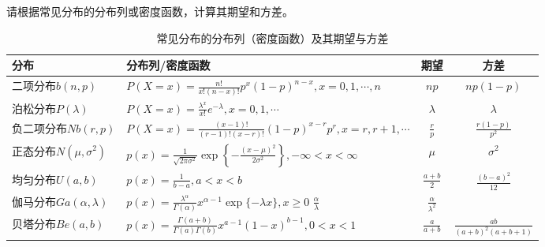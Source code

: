 \begin{enumerate}
\begin{exercise} 请根据常见分布的分布列或密度函数，计算其期望和方差。
	\begin{table}[ht]
			\centering
   \caption{常见分布的分布列（密度函数）及其期望与方差}
			\begin{tabular}{llc c}
				\hline
				分布 & 分布列/密度函数& 期望& 方差\\
				\hline
				二项分布$b(n,p)$ & $P(X=x) = \frac{n!}{x!(n-x)!} p^x (1-p)^{n-x}, x = 0,1, \cdots,n$ & $np$&$np(1-p)$\\
			\hline
				泊松分布$P(\lambda)$ &$P(X=x) = \frac{\lambda^x}{x!} e^{-\lambda }, x = 0,1, \cdots$  & $\lambda$& $\lambda$\\
					\hline
				负二项分布$Nb(r,p)$ &$P(X=x) = \frac{(x-1)!}{(r-1)!(x-r)!} (1-p)^{x-r}p^r, x = r,r+1, \cdots$ & $\frac{r}{p}$& $\frac{r(1-p)}{p^2}$\\
				\hline
				正态分布$N(\mu,\sigma^2)$ &$p(x) = \frac{1}{\sqrt{2\pi \sigma^2}} \exp\left\{-\frac{(x-\mu)^2}{2\sigma^2}\right\}, -\infty <x <\infty$ &$\mu$&$\sigma^2$\\
				\hline
				均匀分布$U(a,b)$ &$p(x) = \frac{1}{b-a}, a<x<b$ & $\frac{a+b}{2}$ & $\frac{(b-a)^2}{12}$\\
				\hline
				伽马分布$Ga(\alpha,\lambda)$ &$p(x) = \frac{\lambda^\alpha}{\Gamma(\alpha)} x^{\alpha -1} \exp\{-\lambda x\}, x \geq  0$ $\frac{\alpha}{\lambda}$&$\frac{\alpha}{\lambda^2}$\\
				\hline
				 贝塔分布$Be(a,b)$ &$p(x) = \frac{\Gamma(a+b)}{\Gamma(a)\Gamma(b)} x^{a-1} (1-x)^{b-1}, 0<x<1$ &$\frac{a}{a+b}$ & $\frac{ab}{(a+b)^2(a+b+1)}$ \\
				\hline
			\end{tabular}
		\end{table}
\end{exercise}
   \end{enumerate}



    